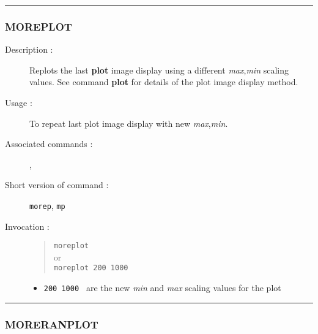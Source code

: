 \hrule
\subsubsection*{\label{MOREPLOT}MOREPLOT}

\begin{description}

\item[Description :] Replots the last {\bf plot} image display using a
different {\it max},{\it min} scaling values.  See command {\bf plot}
for details of the plot image display method.

\item[Usage :] To repeat last plot image display with new {\it max},{\it min}.
\item[Associated commands :] {\tt {}},
{\tt {}}
\item[Short version of command :] {\tt morep}, {\tt mp}
\item[Invocation :]

\begin{quote}{\tt  moreplot }\\
or \\
{\tt moreplot 200 1000 }
\end{quote}

\begin{itemize}

\item {\tt 200 1000 } are the new {\it min} and {\it max} scaling values for the plot
\end{itemize}

\end{description}

\hrule
\subsubsection*{\label{MORERANPLOT}MORERANPLOT}

